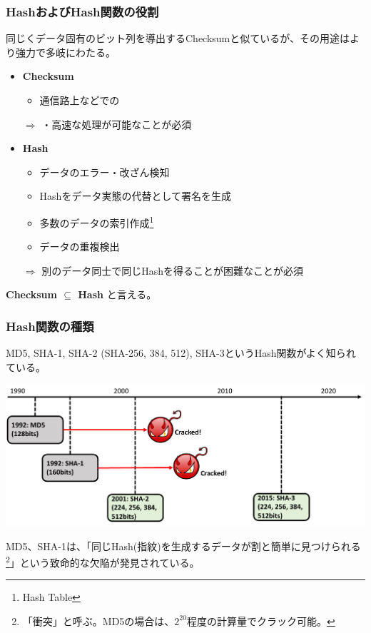 \documentclass[12pt,dvipdfmx]{beamer}
\begin{document}
\begin{frame}
\small
\frametitle{HashおよびHash関数の役割}
同じくデータ固有のビット列を導出するChecksumと似ているが、その用途はより強力で多岐にわたる。

\begin{itemize}
 \item \textbf{Checksum}
\begin{itemize}
 \item 通信路上などでの
\end{itemize}
$\Rightarrow$ ・高速な処理が可能なことが必須
 \item \textbf{Hash}
\begin{itemize}
 \item \alert{データのエラー・改ざん検知}
 \item \alert{Hashをデータ実態の代替として署名を生成}
 \item 多数のデータの索引作成\footnote[frame]{Hash Table} 
 \item データの重複検出
\end{itemize}
$\Rightarrow$ \alert{別のデータ同士で同じHashを得ることが困難}なことが必須
\end{itemize}

\textbf{Checksum $\subseteq$ Hash} と言える。
\end{frame}

\begin{frame}
\frametitle{Hash関数の種類}
 MD5, SHA-1, SHA-2 (SHA-256, 384, 512), SHA-3というHash関数がよく知られている。
 \begin{center}
  \includegraphics[width=\linewidth]{Figs/hash-history.pdf}
 \end{center}
 MD5、SHA-1は、「\alert{同じHash(指紋)を生成するデータが割と簡単に見つけられる}\footnote[frame]{「衝突」と呼ぶ。MD5の場合は、$2^{20}$程度の計算量でクラック可能。}」という致命的な欠陥が発見されている。
\end{frame}
\end{document}
